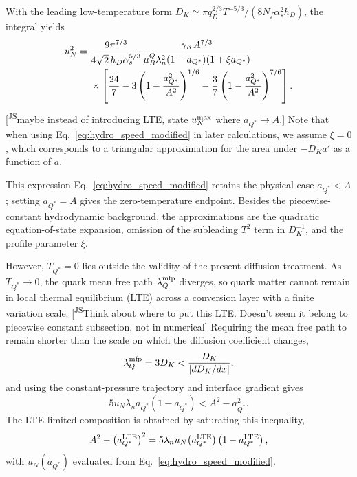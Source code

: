 \documentclass[10pt,superscriptaddress,
amsmath,aps,prc,twocolumn,nofootinbib,floatfix]{revtex4-1}
\newcommand{\AHcom}[1]{\textsf{\color{cyan}{\textsuperscript{AH}#1}}}
\newcommand{\JScom}[1]{\textsf{\color{violet} [\textsuperscript{JS}#1]}}
\newcommand{\Qstar}{\ensuremath{Q^*}}
\newcommand{\Bratio}{\lambda_n}
\begin{document}
With the leading low-temperature form $D_K\simeq\pi q_D^{2/3}T^{-5/3}/(8N_f\alpha_s^2h_D)$, the integral yields
\begin{align}
 u_N^2
 ={}&
 \frac{9\pi^{7/3}}
 {4\sqrt{2}\,h_D\alpha_s^{5/3}}
 \frac{\gamma_K A^{7/3}}
 {\mu_B^Q \Bratio^2
 (1-a_{\Qstar})(1+\xi a_{\Qstar})}
\notag\\
 &\times
 \left[
 \frac{24}{7}
 -3\left(1-\frac{a_{\Qstar}^2}{A^2}\right)^{1/6}
 -\frac{3}{7}
 \left(1-\frac{a_{\Qstar}^2}{A^2}\right)^{7/6}
 \right].
\label{eq:hydro_speed_modified}
\end{align}
\AHcom{is this still old meaning of aQs?}
\JScom{maybe instead of introducing LTE, state $u_N^{\rm max}$ where $a_\Qstar \to A$.}
Note that when using Eq.~\eqref{eq:hydro_speed_modified} in later calculations, we assume $\xi = 0$, which corresponds to a triangular approximation for the area under $-D_Ka'$ as a function of $a$.

This expression Eq.~\eqref{eq:hydro_speed_modified} retains the physical case $a_{\Qstar}<A$; setting $a_{\Qstar}=A$ gives the zero-temperature endpoint.  
Besides the piecewise-constant hydrodynamic background, the approximations are the quadratic equation-of-state expansion, omission of the subleading $T^2$ term in $D_K^{-1}$, and the profile parameter $\xi$. 

However, $T_{\Qstar}=0$ lies outside the validity of the present diffusion treatment.
As $T_{\Qstar}\to0$, the quark mean free path $\lambda^{\rm mfp}_Q$ diverges, so quark matter cannot remain in local thermal equilibrium (LTE) across a conversion layer with a finite variation scale.\JScom{Think about where to put this LTE. Doesn't seem it belong to piecewise constant subsection, not in numerical}
Requiring the mean free path to remain shorter than the scale on which the diffusion coefficient changes,
\begin{equation}
 \lambda^{\rm mfp}_Q=3D_K
 <
 \frac{D_K}{|dD_K/dx|},
\label{eq:hydro_LTE_condition}
\end{equation}
and using the constant-pressure trajectory and interface gradient gives
\begin{equation}
 5u_N\Bratio a_{\Qstar}(1-a_{\Qstar})
 < A^2-a_{\Qstar}^2.
\label{eq:hydro_LTE_inequality}
\end{equation}
The LTE-limited composition is obtained by saturating this inequality,
\begin{equation}
 A^2-\left(a_{\Qstar}^{\rm LTE}\right)^2
 =
 5\Bratio u_N\!\left(a_{\Qstar}^{\rm LTE}\right)
 \left(1-a_{\Qstar}^{\rm LTE}\right),
\label{eq:hydro_LTE_cutoff}
\end{equation}
with $u_N(a_{\Qstar})$ evaluated from
Eq.~\eqref{eq:hydro_speed_modified}.
\end{document}
